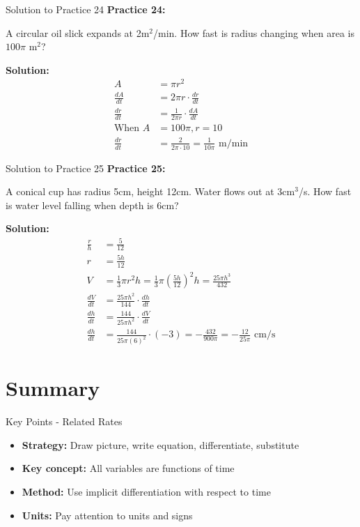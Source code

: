 \documentclass[aspectratio=169]{beamer}
\begin{document}
\begin{frame}{Solution to Practice 24}
\textbf{Practice 24:}

A circular oil slick expands at 2m$^2$/min. How fast is radius changing when area is $100\pi$ m$^2$?

\textbf{Solution:}
\[
\begin{aligned}
  A &= \pi r^2 \\
  \frac{dA}{dt} &= 2\pi r \cdot \frac{dr}{dt} \\
  \frac{dr}{dt} &= \frac{1}{2\pi r} \cdot \frac{dA}{dt} \\
  \text{When } A &= 100\pi, r = 10 \\
  \frac{dr}{dt} &= \frac{2}{2\pi \cdot 10} = \frac{1}{10\pi} \text{ m/min}
\end{aligned}
\]
\end{frame}

\begin{frame}{Solution to Practice 25}
\textbf{Practice 25:}

A conical cup has radius 5cm, height 12cm. Water flows out at 3cm$^3$/s. How fast is water level falling when depth is 6cm?

\textbf{Solution:}
\[
\begin{aligned}
  \frac{r}{h} &= \frac{5}{12} \\
  r &= \frac{5h}{12} \\
  V &= \frac{1}{3}\pi r^2 h = \frac{1}{3}\pi(\frac{5h}{12})^2 h = \frac{25\pi h^3}{432} \\
  \frac{dV}{dt} &= \frac{25\pi h^2}{144} \cdot \frac{dh}{dt} \\
  \frac{dh}{dt} &= \frac{144}{25\pi h^2} \cdot \frac{dV}{dt} \\
  \frac{dh}{dt} &= \frac{144}{25\pi(6)^2} \cdot (-3) = -\frac{432}{900\pi} = -\frac{12}{25\pi} \text{ cm/s}
\end{aligned}
\]
\end{frame}

\section{Summary}

\begin{frame}{Key Points - Related Rates}
\begin{itemize}
    \item \textbf{Strategy:} Draw picture, write equation, differentiate, substitute
    \item \textbf{Key concept:} All variables are functions of time
    \item \textbf{Method:} Use implicit differentiation with respect to time
    \item \textbf{Units:} Pay attention to units and signs
\end{itemize}
\end{frame}
\end{document}
